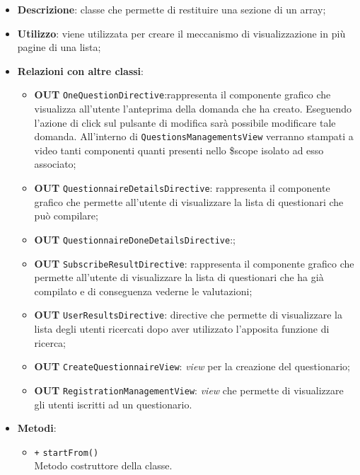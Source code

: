 \begin{itemize}
	\item \textbf{Descrizione}: classe che permette di restituire una sezione di un array;
	\item \textbf{Utilizzo}: viene utilizzata per creare il meccanismo di visualizzazione in più pagine di una lista;
	\item \textbf{Relazioni con altre classi}:
	\begin{itemize}
		\item \textbf{OUT} \texttt{OneQuestionDirective}:rappresenta il componente grafico che visualizza all'utente l'anteprima della domanda che ha creato. Eseguendo l'azione di click sul pulsante di modifica sarà possibile modificare tale domanda. All'interno di \texttt{QuestionsManagementsView} verranno stampati a video tanti componenti quanti presenti nello \$scope isolato ad esso associato; 
		\item \textbf{OUT} \texttt{QuestionnaireDetailsDirective}: rappresenta il componente grafico che permette all'utente di visualizzare la lista di questionari che può compilare; 
		\item \textbf{OUT} \texttt{QuestionnaireDoneDetailsDirective}:; 
		\item \textbf{OUT} \texttt{SubscribeResultDirective}: rappresenta il componente grafico che permette all'utente di visualizzare la lista di questionari che ha già compilato e di conseguenza vederne le valutazioni; 
		\item \textbf{OUT} \texttt{UserResultsDirective}: directive che permette di visualizzare la lista degli utenti ricercati dopo aver utilizzato l'apposita funzione di ricerca; 
		\item \textbf{OUT} \texttt{CreateQuestionnaireView}: \textit{view} per la creazione del questionario; 
		\item \textbf{OUT} \texttt{RegistrationManagementView}: \textit{view} che permette di visualizzare gli utenti iscritti ad un questionario.
	\end{itemize}
	\item \textbf{Metodi}:
	\begin{itemize}
		\item \texttt{+} \texttt{startFrom()} \\
		Metodo costruttore della classe.
	\end{itemize}
\end{itemize}


